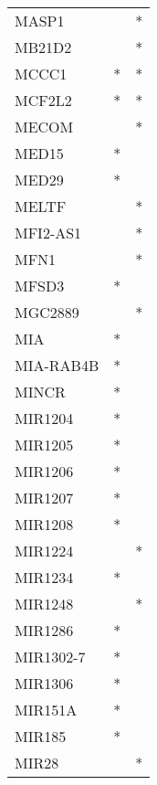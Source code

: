 \begin{longtable}{lcc}
MASP1            &                &          * \\
MB21D2           &                &          * \\
MCCC1            &              * &          * \\
MCF2L2           &              * &          * \\
MECOM            &                &          * \\
MED15            &              * &            \\
MED29            &              * &            \\
MELTF            &                &          * \\
MFI2-AS1         &                &          * \\
MFN1             &                &          * \\
MFSD3            &              * &            \\
MGC2889          &                &          * \\
MIA              &              * &            \\
MIA-RAB4B        &              * &            \\
MINCR            &              * &            \\
MIR1204          &              * &            \\
MIR1205          &              * &            \\
MIR1206          &              * &            \\
MIR1207          &              * &            \\
MIR1208          &              * &            \\
MIR1224          &                &          * \\
MIR1234          &              * &            \\
MIR1248          &                &          * \\
MIR1286          &              * &            \\
MIR1302-7        &              * &            \\
MIR1306          &              * &            \\
MIR151A          &              * &            \\
MIR185           &              * &            \\
MIR28            &                &          * \\

\end{longtable}

